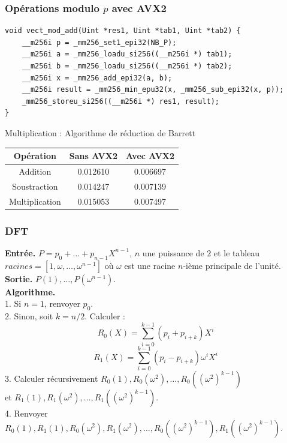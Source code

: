\documentclass[8pt]{beamer}
\begin{document}
\begin{frame}[fragile]
\frametitle{Opérations modulo $p$ avec AVX2}

\begin{lstlisting}
void vect_mod_add(Uint *res1, Uint *tab1, Uint *tab2) {
    __m256i p = _mm256_set1_epi32(NB_P);
    __m256i a = _mm256_loadu_si256((__m256i *) tab1);
    __m256i b = _mm256_loadu_si256((__m256i *) tab2);
    __m256i x = _mm256_add_epi32(a, b);
    __m256i result = _mm256_min_epu32(x, _mm256_sub_epi32(x, p));
    _mm256_storeu_si256((__m256i *) res1, result);
}
\end{lstlisting}

Multiplication : Algorithme de réduction de Barrett

\begin{center}
\begin{tabular}{||c c c||}
\hline
Opération & Sans AVX2 & Avec AVX2 \\
\hline\hline
Addition & 0.012610 & 0.006697 \\
\hline
Soustraction & 0.014247 & 0.007139 \\
\hline
Multiplication & 0.015053 & 0.007497 \\
\hline
\end{tabular}
\end{center}
{}

\end{frame}

\begin{frame}
\frametitle{DFT}

\begin{tcolorbox}[colback=cyan!5!white,
                  colframe=cyan!100!black,
                  title=\textbf{Algorithme DFT}
                 ]
\textbf{Entrée.} $P = p_0+\dots+p_{n-1}X^{n-1}$, $n$ une puissance de $2$ et le tableau $ racines = [1, \omega,\dots,\omega^{n-1}]$ où $\omega$ est une racine $n$-ième principale de l'unité.\\[0.1cm]
\textbf{Sortie.} $P(1),\dots,P(\omega^{n-1})$.\\[0.1cm]
\textbf{Algorithme.} \\[0.1cm]
1. \textit{}Si $n=1$, renvoyer $p_0$. \\ [0.1cm]
2. \textit{}Sinon, soit $k=n/2$. Calculer :\\
\[ R_0(X) = \sum_{i=0}^{k-1}(p_i+p_{i+k})X^i \]
\[ R_1(X) = \sum_{i=0}^{k-1}(p_i-p_{i+k})\omega^iX^i \]
3. \textit{}Calculer récursivement $R_0(1), R_0(\omega^2),\dots,R_0((\omega^2)^{k-1})$ \\ [0.1cm]
et $R_1(1), R_1(\omega^2),\dots,R_1((\omega^2)^{k-1})$. \\[0.2cm]
4. \textit{}Renvoyer $R_0(1), R_1(1), R_0(\omega^2), R_1(\omega^2),\dots, R_0((\omega^2)^{k-1}), R_1((\omega^2)^{k-1})$.
\end{tcolorbox}
\ \\

\end{frame}
\end{document}

